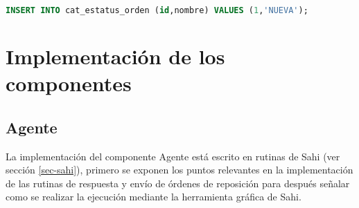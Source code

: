 \begin{lstlisting}[language=SQL, caption={Sentencia insertar un registro.}, captionpos=b, label={lst:sql-insert}]
INSERT INTO cat_estatus_orden (id,nombre) VALUES (1,'NUEVA');
\end{lstlisting}

%

\section{Implementación de los componentes}

\subsection{Agente}
La implementación del componente Agente está escrito en rutinas de Sahi (ver sección \ref{sec-sahi}), primero se exponen los puntos relevantes en la implementación de las rutinas de respuesta y envío de órdenes de reposición para después señalar como se realizar la ejecución mediante la herramienta gráfica de Sahi.

